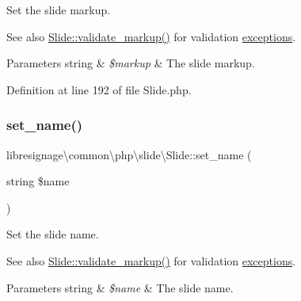 Set the slide markup.

\begin{DoxySeeAlso}{See also}
\hyperlink{classlibresignage_1_1common_1_1php_1_1slide_1_1Slide_a390a7bca0562fb0945cd694c6f7e7dcd}{Slide\+::validate\+\_\+markup()} for validation \hyperlink{namespacelibresignage_1_1common_1_1php_1_1slide_1_1exceptions}{exceptions}.
\end{DoxySeeAlso}

\begin{DoxyParams}[1]{Parameters}
string & {\em \$markup} & The slide markup. \\
\hline
\end{DoxyParams}


Definition at line 192 of file Slide.\+php.

\mbox{\label{classlibresignage_1_1common_1_1php_1_1slide_1_1Slide_a331db9d6bda9ffd93facd1bce07e1acc}} 
\subsubsection{\texorpdfstring{set\+\_\+name()}{set\_name()}}
{\footnotesize\ttfamily libresignage\textbackslash{}common\textbackslash{}php\textbackslash{}slide\textbackslash{}\+Slide\+::set\+\_\+name (\begin{DoxyParamCaption}\item[{string}]{\$name }\end{DoxyParamCaption})}

Set the slide name.

\begin{DoxySeeAlso}{See also}
\hyperlink{classlibresignage_1_1common_1_1php_1_1slide_1_1Slide_a390a7bca0562fb0945cd694c6f7e7dcd}{Slide\+::validate\+\_\+markup()} for validation \hyperlink{namespacelibresignage_1_1common_1_1php_1_1slide_1_1exceptions}{exceptions}.
\end{DoxySeeAlso}

\begin{DoxyParams}[1]{Parameters}
string & {\em \$name} & The slide name. \\
\hline
\end{DoxyParams}


